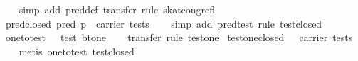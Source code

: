 \begin{isabellebody}
%
\isadelimproof
\ \ %
\endisadelimproof
%
\isatagproof
{}\isamarkupfalse%
\ {}simp\ add{}\ pred{}def{}\ transfer{}\ rule\ skat{}cong{}refl{}%
\endisatagproof
{\isafoldproof}%
%
\isadelimproof
\isanewline
%
\endisadelimproof
\isanewline
{}\isamarkupfalse%
\ pred{}closed{}\ {}pred\ p\ {}\ carrier\ tests{}\isanewline
%
\isadelimproof
\ \ %
\endisadelimproof
%
\isatagproof
{}\isamarkupfalse%
\ {}simp\ add{}\ pred{}test{}\ rule\ test{}closed{}%
\endisatagproof
{\isafoldproof}%
%
\isadelimproof
\isanewline
%
\endisadelimproof
\isanewline
\isanewline
\isanewline
{}\isamarkupfalse%
\ one{}to{}test{}\ {}{}\ {}\ test\ {}bt{}one{}{}\isanewline
%
\isadelimproof
\ \ %
\endisadelimproof
%
\isatagproof
{}\isamarkupfalse%
\ {}transfer{}\ rule\ test{}one{}%
\endisatagproof
{\isafoldproof}%
%
\isadelimproof
\isanewline
%
\endisadelimproof
\isanewline
{}\isamarkupfalse%
\ test{}one{}closed{}\ {}{}\ {}\ carrier\ tests{}\isanewline
%
\isadelimproof
\ \ %
\endisadelimproof
%
\isatagproof
{}\isamarkupfalse%
\ {}metis\ one{}to{}test\ test{}closed{}%

\end{isabellebody}
